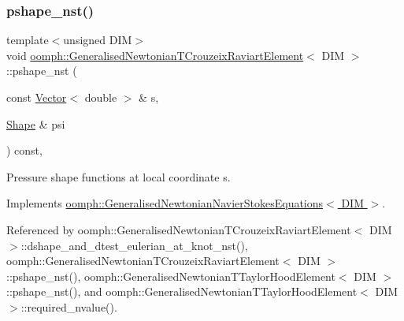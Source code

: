 \subsubsection{\texorpdfstring{pshape\+\_\+nst()}{pshape\_nst()}\hspace{0.1cm}{\footnotesize\ttfamily [1/6]}}
{\footnotesize\ttfamily template$<$unsigned D\+IM$>$ \\
void \hyperlink{classoomph_1_1GeneralisedNewtonianTCrouzeixRaviartElement}{oomph\+::\+Generalised\+Newtonian\+T\+Crouzeix\+Raviart\+Element}$<$ D\+IM $>$\+::pshape\+\_\+nst (\begin{DoxyParamCaption}\item[{const \hyperlink{classoomph_1_1Vector}{Vector}$<$ double $>$ \&}]{s,  }\item[{\hyperlink{classoomph_1_1Shape}{Shape} \&}]{psi }\end{DoxyParamCaption}) const\hspace{0.3cm}{\ttfamily [inline]}, {\ttfamily [virtual]}}



Pressure shape functions at local coordinate s. 



Implements \hyperlink{classoomph_1_1GeneralisedNewtonianNavierStokesEquations_a84735d21f3d1ade819726a71a7b462e1}{oomph\+::\+Generalised\+Newtonian\+Navier\+Stokes\+Equations$<$ D\+I\+M $>$}.



Referenced by oomph\+::\+Generalised\+Newtonian\+T\+Crouzeix\+Raviart\+Element$<$ D\+I\+M $>$\+::dshape\+\_\+and\+\_\+dtest\+\_\+eulerian\+\_\+at\+\_\+knot\+\_\+nst(), oomph\+::\+Generalised\+Newtonian\+T\+Crouzeix\+Raviart\+Element$<$ D\+I\+M $>$\+::pshape\+\_\+nst(), oomph\+::\+Generalised\+Newtonian\+T\+Taylor\+Hood\+Element$<$ D\+I\+M $>$\+::pshape\+\_\+nst(), and oomph\+::\+Generalised\+Newtonian\+T\+Taylor\+Hood\+Element$<$ D\+I\+M $>$\+::required\+\_\+nvalue().

\mbox{\label{classoomph_1_1GeneralisedNewtonianTCrouzeixRaviartElement_aa63eaa8f55cb948e2916e869aa735a21}} 
